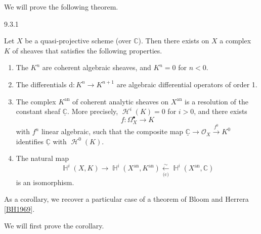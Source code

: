   We will prove the following theorem.\begin{proposition}{9.3.1}\label{hodge-theory-iii-9.3.1}\skipsinglepar\par{}Let \(X\) be a quasi-projective scheme (over \(\mathbb {C}\)).
    Then there exists on \(X\) a complex \(K\) of sheaves that satisfies the following properties.

    
 \begin{enumerate}
      
 \item[(a)]
        The \(K^n\) are coherent algebraic sheaves, and \(K^n=0\) for \(n<0\).
      

      
 \item[(b)]
        The differentials \(\mathrm {d}\colon  K^n\to  K^{n+1}\) are algebraic differential operators of order 1.
      

      
 \item[(c)]
        The complex \(K^\mathrm {an}\) of coherent analytic sheaves on \(X^\mathrm {an}\) is a resolution of the constant sheaf \(\underline {\mathbb {C}}\).
        More precisely, \(\operatorname {\mathscr {H}}^i(K)=0\) for \(i>0\), and there exists
        \[           f\colon  \Omega _X^\bullet            \to  K         \]
        with \(f^n\) linear algebraic, such that the composite map \(\underline {\mathbb {C}}\to \mathcal {O}_X\xrightarrow {f^0}K^0\) identifies \(\underline {\mathbb {C}}\) with \(\operatorname {\mathscr {H}}^0(K)\).
      

      
 \item[(d)]
        The natural map
        \[           \operatorname {\mathbb {H}}^i(X,K)           \to  \operatorname {\mathbb {H}}^i(X^\mathrm {an},K^\mathrm {an})           \xleftarrow [\text {(c)}]{\sim } \operatorname {\mathbb {H}}^i(X^\mathrm {an},\mathbb {C})         \]
        is an isomorphism.
      

    \end{enumerate}\end{proposition}\par{}As a corollary, we recover a particular case of a theorem of Bloom and Herrera [\hyperref[BH1969]{BH1969}].\par{}We will first prove the corollary.
